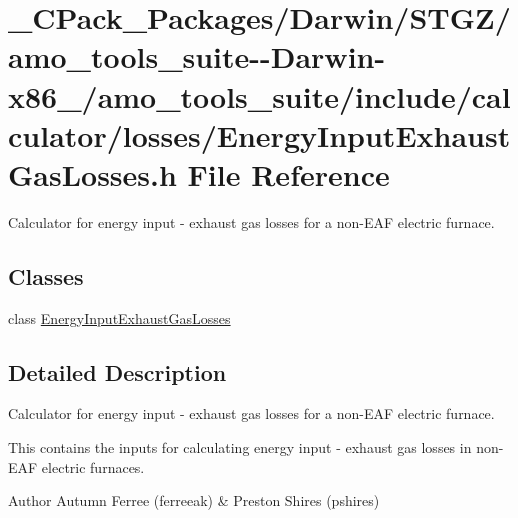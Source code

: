 \hypertarget{___c_pack___packages_2_darwin_2_s_t_g_z_2amo__tools__suite--_darwin-x86__64_2amo__tools__suite_292e6f95923a64cc06827649b8f64f80c}{}\section{\+\_\+\+C\+Pack\+\_\+\+Packages/\+Darwin/\+S\+T\+G\+Z/amo\+\_\+tools\+\_\+suite-\/-\/\+Darwin-\/x86\+\_/amo\+\_\+tools\+\_\+suite/include/calculator/losses/\+Energy\+Input\+Exhaust\+Gas\+Losses.h File Reference}
\label{___c_pack___packages_2_darwin_2_s_t_g_z_2amo__tools__suite--_darwin-x86__64_2amo__tools__suite_292e6f95923a64cc06827649b8f64f80c}


Calculator for energy input -\/ exhaust gas losses for a non-\/\+E\+AF electric furnace.  


\subsection*{Classes}
\begin{DoxyCompactItemize}
\item 
class \hyperlink{class_energy_input_exhaust_gas_losses}{Energy\+Input\+Exhaust\+Gas\+Losses}
\end{DoxyCompactItemize}


\subsection{Detailed Description}
Calculator for energy input -\/ exhaust gas losses for a non-\/\+E\+AF electric furnace. 

This contains the inputs for calculating energy input -\/ exhaust gas losses in non-\/\+E\+AF electric furnaces.

\begin{DoxyAuthor}{Author}
Autumn Ferree (ferreeak) \& Preston Shires (pshires) 
\end{DoxyAuthor}
